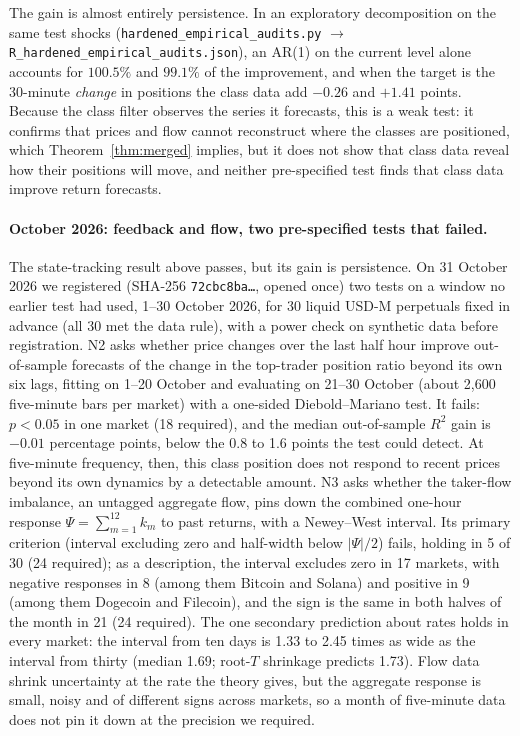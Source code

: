 The gain is almost entirely persistence. In an exploratory decomposition on the same test shocks (\texttt{hardened\_empirical\_audits.py} $\to$ \texttt{R\_hardened\_empirical\_audits.json}), an AR(1) on the current level alone accounts for $100.5\%$ and $99.1\%$ of the improvement, and when the target is the 30-minute \emph{change} in positions the class data add $-0.26$ and $+1.41$ points. Because the class filter observes the series it forecasts, this is a weak test: it confirms that prices and flow cannot reconstruct where the classes are positioned, which Theorem~\ref{thm:merged} implies, but it does not show that class data reveal how their positions will move, and neither pre-specified test finds that class data improve return forecasts.

\paragraph{October 2026: feedback and flow, two pre-specified tests that failed.} The state-tracking result above passes, but its gain is persistence. On 31 October 2026 we registered (SHA-256 \texttt{72cbc8ba\ldots}, opened once) two tests on a window no earlier test had used, 1--30 October 2026, for 30 liquid USD-M perpetuals fixed in advance (all 30 met the data rule), with a power check on synthetic data before registration. N2 asks whether price changes over the last half hour improve out-of-sample forecasts of the change in the top-trader position ratio beyond its own six lags, fitting on 1--20 October and evaluating on 21--30 October (about 2,600 five-minute bars per market) with a one-sided Diebold--Mariano test. It fails: $p<0.05$ in one market (18 required), and the median out-of-sample $R^2$ gain is $-0.01$ percentage points, below the 0.8 to 1.6 points the test could detect. At five-minute frequency, then, this class position does not respond to recent prices beyond its own dynamics by a detectable amount. N3 asks whether the taker-flow imbalance, an untagged aggregate flow, pins down the combined one-hour response $\Psi=\sum_{m=1}^{12}k_m$ to past returns, with a Newey--West interval. Its primary criterion (interval excluding zero and half-width below $|\Psi|/2$) fails, holding in 5 of 30 (24 required); as a description, the interval excludes zero in 17 markets, with negative responses in 8 (among them Bitcoin and Solana) and positive in 9 (among them Dogecoin and Filecoin), and the sign is the same in both halves of the month in 21 (24 required). The one secondary prediction about rates holds in every market: the interval from ten days is 1.33 to 2.45 times as wide as the interval from thirty (median 1.69; root-$T$ shrinkage predicts 1.73). Flow data shrink uncertainty at the rate the theory gives, but the aggregate response is small, noisy and of different signs across markets, so a month of five-minute data does not pin it down at the precision we required.


